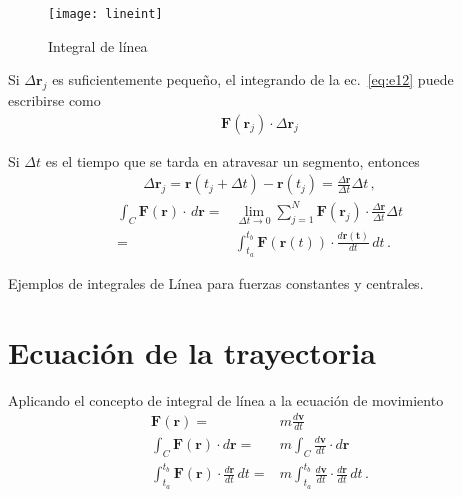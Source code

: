 \begin{frame}
\begin{figure}
  \centering
  \texttt{[image: lineint]}
  \caption{Integral de línea}
  \label{fig:lineint}
\end{figure}
\end{frame}

Si $\Delta \mathbf{r}_j$ es suficientemente pequeño, el integrando de la ec.~\eqref{eq:e12} puede escribirse como
\begin{align}
  \label{eq:dW}
  \mathbf{F}(\mathbf{r}_j)\cdot\Delta\mathbf{r}_j
\end{align}

Si $\Delta t$ es el tiempo que se tarda en atravesar un segmento, entonces
\begin{align}
  \Delta\mathbf{r}_j = \mathbf{r}(t_j+\Delta t)-\mathbf{r}(t_j)=\frac{\Delta\mathbf{r}}{\Delta t}\Delta t\,,
\end{align}
\begin{align}
  \int_C \mathbf{F}(\mathbf{r})\cdot\,d\mathbf{r}=&\lim_{\Delta t\to 0}\sum_{j=1}^N\mathbf{F}(\mathbf{r}_j)\cdot\frac{\Delta\mathbf{r}}{\Delta t}\Delta t\nonumber\\
=&\int_{t_a}^{t_b}\mathbf{F}(\mathbf{r}(t))\cdot\frac{d\mathbf{r(t)}}{dt}\,dt\,.
\end{align}
\begin{inprogress}
  Ejemplos de integrales de Línea para fuerzas constantes y centrales.
\end{inprogress}


\section{Ecuación de la trayectoria}

Aplicando el concepto de integral de línea a la ecuación de movimiento
\begin{align}
\label{eq:trayectoria}
  \mathbf{F}(\mathbf{r})=&m\frac{d\mathbf{v}}{dt}\nonumber\\
  \int_C\mathbf{F}(\mathbf{r})\cdot d\mathbf{r}=&m\int_C\frac{d\mathbf{v}}{dt}\cdot d\mathbf{r}\nonumber\\
 \int_{t_a}^{t_b}\mathbf{F}(\mathbf{r})\cdot \frac{d\mathbf{r}}{dt}\,dt=&m\int_{t_a}^{t_b}\frac{d\mathbf{v}}{dt}\cdot \frac{d\mathbf{r}}{dt}\,dt\,.
\end{align}

